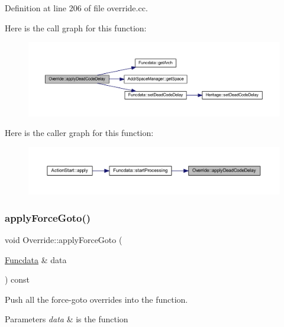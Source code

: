 Definition at line 206 of file override.\+cc.

Here is the call graph for this function\+:
\nopagebreak
\begin{figure}[H]
\begin{center}
\leavevmode
\includegraphics[width=350pt]{class_override_ae1c4b43226ff096764f6d98f325ae759_cgraph}
\end{center}
\end{figure}
Here is the caller graph for this function\+:
\nopagebreak
\begin{figure}[H]
\begin{center}
\leavevmode
\includegraphics[width=350pt]{class_override_ae1c4b43226ff096764f6d98f325ae759_icgraph}
\end{center}
\end{figure}
\mbox{\label{class_override_a7920e3b6030b283342a0da67fbc69505}} 
\subsubsection{\texorpdfstring{applyForceGoto()}{applyForceGoto()}}
{\footnotesize\ttfamily void Override\+::apply\+Force\+Goto (\begin{DoxyParamCaption}\item[{\mbox{\hyperlink{class_funcdata}{Funcdata}} \&}]{data }\end{DoxyParamCaption}) const}



Push all the force-\/goto overrides into the function. 


\begin{DoxyParams}{Parameters}
{\em data} & is the function \\
\hline
\end{DoxyParams}


